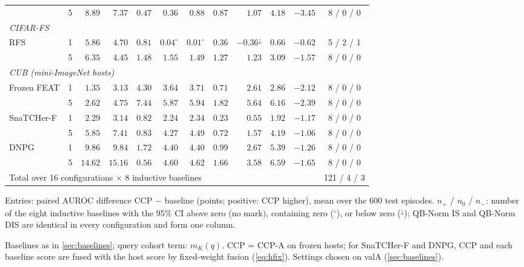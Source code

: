 \begin{table}[tbp]
\begin{tabular}{lcrrrrrrrrrc}
 & 5 & $8.89$ & $7.37$ & \underline{$0.47$} & \textbf{\boldmath $0.36$} & $0.88$ & $0.87$ & $1.07$ & $4.18$ & $-3.45$ & 8 / 0 / 0 \\
\multicolumn{12}{l}{\textit{CIFAR-FS}} \\
\quad RFS & 1 & $5.86$ & $4.70$ & $0.81$ & $0.04^{\circ}$ & \underline{$0.01^{\circ}$} & $0.36$ & \textbf{\boldmath $-0.36^{\downarrow}$} & $0.66$ & $-0.62$ & 5 / 2 / 1 \\
 & 5 & $6.35$ & $4.45$ & $1.48$ & $1.55$ & $1.49$ & \underline{$1.27$} & \textbf{\boldmath $1.23$} & $3.09$ & $-1.57$ & 8 / 0 / 0 \\
\multicolumn{12}{l}{\textit{CUB (mini-ImageNet hosts)}} \\
\quad Frozen FEAT & 1 & \underline{$1.35$} & $3.13$ & $4.30$ & $3.64$ & $3.71$ & \textbf{\boldmath $0.71$} & $2.61$ & $2.86$ & $-2.12$ & 8 / 0 / 0 \\
 & 5 & \underline{$2.62$} & $4.75$ & $7.44$ & $5.87$ & $5.94$ & \textbf{\boldmath $1.82$} & $5.64$ & $6.16$ & $-2.39$ & 8 / 0 / 0 \\
\quad SnaTCHer-F & 1 & $2.29$ & $3.14$ & $0.82$ & $2.24$ & $2.34$ & \textbf{\boldmath $0.23$} & \underline{$0.55$} & $1.92$ & $-1.17$ & 8 / 0 / 0 \\
 & 5 & $5.85$ & $7.41$ & \underline{$0.83$} & $4.27$ & $4.49$ & \textbf{\boldmath $0.72$} & $1.57$ & $4.19$ & $-1.06$ & 8 / 0 / 0 \\
\quad DNPG & 1 & $9.86$ & $9.84$ & \underline{$1.72$} & $4.40$ & $4.40$ & \textbf{\boldmath $0.99$} & $2.67$ & $5.39$ & $-1.26$ & 8 / 0 / 0 \\
 & 5 & $14.62$ & $15.16$ & \textbf{\boldmath $0.56$} & $4.60$ & $4.62$ & \underline{$1.66$} & $3.58$ & $6.59$ & $-1.65$ & 8 / 0 / 0 \\
\midrule
\multicolumn{11}{l}{Total over 16 configurations $\times$ 8 inductive baselines} & 121 / 4 / 3 \\
\bottomrule
\end{tabular}
\par\smallskip
\begin{minipage}{\linewidth}\scriptsize
Entries: paired AUROC difference CCP $-$ baseline (points; positive: CCP higher), mean over the 600 test episodes. $n_{+}$ / $n_{0}$ / $n_{-}$: number of the eight inductive baselines with the 95\% CI above zero (no mark), containing zero ($^{\circ}$), or below zero ($^{\downarrow}$); QB-Norm IS and QB-Norm DIS are identical in every configuration and form one column.\par
Baselines as in \cref{sec:baselines}; query cohort term: $m_K(q)$. CCP = CCP-A on frozen hosts; for SnaTCHer-F and DNPG, CCP and each baseline score are fused with the host score by fixed-weight fusion (\cref{eq:hfix}). Settings chosen on valA (\cref{sec:baselines}).\par
\end{minipage}
\end{table}
